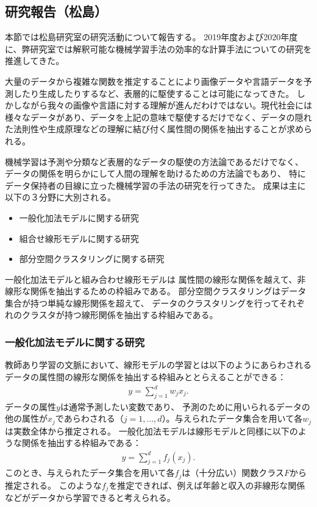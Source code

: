 \subsection{研究報告（松島）}
本節では松島研究室の研究活動について報告する。
2019年度および2020年度に、弊研究室では解釈可能な機械学習手法の効率的な計算手法についての研究を推進してきた。

大量のデータから複雑な関数を推定することにより画像データや言語データを予測したり生成したりするなど、表層的に駆使することは可能になってきた。
しかしながら我々の画像や言語に対する理解が進んだわけではない。現代社会には様々なデータがあり、データを上記の意味で駆使するだけでなく、データの隠れた法則性や生成原理などの理解に結び付く属性間の関係を抽出することが求められる。

機械学習は予測や分類など表層的なデータの駆使の方法論であるだけでなく、
データの関係を明らかにして人間の理解を助けるための方法論でもあり、
特にデータ保持者の目線に立った機械学習の手法の研究を行ってきた。
成果は主に以下の３分野に大別される。
\begin{itemize}
    \item 一般化加法モデルに関する研究
    \item 組合せ線形モデルに関する研究
    \item 部分空間クラスタリングに関する研究
\end{itemize}

一般化加法モデルと組み合わせ線形モデルは
属性間の線形な関係を越えて、非線形な関係を抽出するための枠組みである。
部分空間クラスタリングはデータ集合が持つ単純な線形関係を超えて、
データのクラスタリングを行ってそれぞれのクラスタが持つ線形関係を抽出する枠組みである。


\subsubsection{一般化加法モデルに関する研究}
教師あり学習の文脈において、線形モデルの学習とは以下のようにあらわされるデータの属性間の線形な関係を抽出する枠組みととらえることができる：
\begin{align*}
    y = \sum_{j=1}^d w_j x_j.
\end{align*}
データの属性$y$は通常予測したい変数であり、
予測のために用いられるデータの他の属性が$x_j$であらわされる（$j=1,\ldots,d$）。与えられたデータ集合を用いて各$w_j$は実数全体から推定される。
一般化加法モデル\cite{F}は線形モデルと同様に以下のような関係を抽出する枠組みである：
\begin{align*}
    y = \sum_{j=1}^d f_j (x_j).
\end{align*}
このとき、与えられたデータ集合を用いて各$f_j$は（十分広い）関数クラス$F$から推定される。
このような$f_j$を推定できれば、例えば年齢と収入の非線形な関係などがデータから学習できると考えられる。

